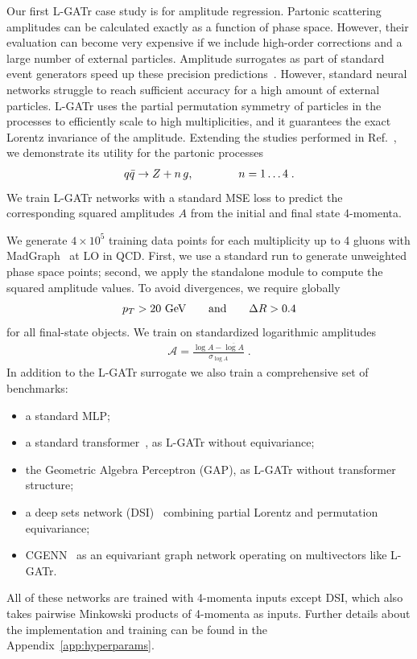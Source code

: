 \documentclass[submission, Phys]{SciPost}
\begin{document}
Our first L-GATr case study is for amplitude regression.
%
Partonic scattering amplitudes can be calculated exactly as a function of phase space. However, their evaluation can become very expensive if we include high-order corrections and a large number of external particles. Amplitude surrogates as part of standard event generators speed up these precision predictions~\cite{Aylett-Bullock:2021hmo,Maitre:2021uaa,Badger:2022hwf,Maitre:2023dqz}. However, standard neural networks struggle to reach sufficient accuracy for a high amount of external particles. L-GATr uses the partial permutation symmetry of particles in the processes to efficiently scale to high multiplicities, and it guarantees the exact Lorentz invariance of the amplitude. Extending the studies performed in Ref.~\cite{Spinner:2024hjm}, we demonstrate its utility for the partonic processes
%
\begin{align}
 q \bar{q} \to Z + n  \, g, 
 \qquad\qquad n=1 \ldots 4 \; .
\end{align}
%
We train L-GATr networks with a standard MSE loss to predict the corresponding squared amplitudes $A$ from the initial and final state 4-momenta. 

We generate $4 \times 10^5$ training data points for each multiplicity up to 4 gluons with MadGraph~\cite{madgraph} at LO in QCD. First, we use a standard run to generate unweighted phase space points; second, we apply the standalone module to compute the squared amplitude values. To avoid divergences, we require globally
%
\begin{align}
 p_T > 20~\text{GeV}
 \qquad \text{and}\qquad
 \Delta R > 0.4 
\end{align}
%
for all final-state objects. We train on standardized logarithmic amplitudes 
%
\begin{align}
\mathcal{A} = \frac{\log A - \overline{\log A}}{\sigma_{\log A}} \; .
\label{eq:amp_pre}
\end{align}
%
In addition to the L-GATr surrogate we also train a comprehensive set of benchmarks:
%
\begin{itemize}
\item a standard MLP; 
\item a standard transformer~\cite{vaswani2017attention}, as L-GATr without equivariance;
\item the Geometric Algebra Perceptron (GAP), as L-GATr without transformer structure;
\item a deep sets network (DSI)~\cite{zaheer2017deep} combining partial Lorentz and permutation equivariance;
\item CGENN~\cite{ruhe2023clifford} as an equivariant graph network operating on multivectors like L-GATr.
\end{itemize}
%
All of these networks are trained with 4-momenta inputs except DSI, which also takes pairwise Minkowski products of 4-momenta as inputs. Further details about the implementation and training can be found in the Appendix~\ref{app:hyperparams}.
\end{document}
